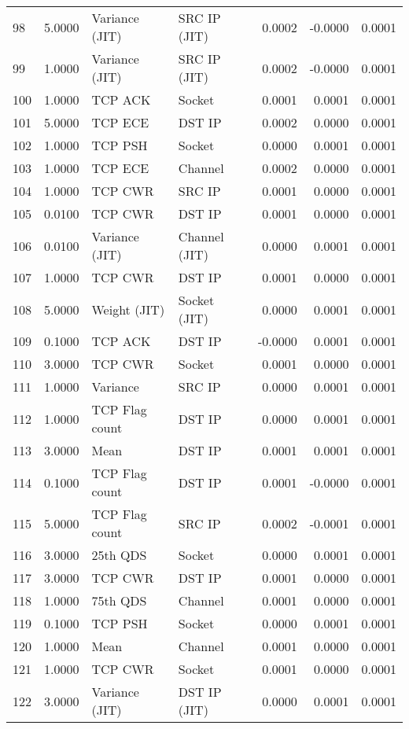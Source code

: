 \begin{longtable}{lrllrrr}
98 & 5.0000 & Variance (JIT) & SRC IP (JIT) & 0.0002 & -0.0000 & 0.0001 \\
99 & 1.0000 & Variance (JIT) & SRC IP (JIT) & 0.0002 & -0.0000 & 0.0001 \\
100 & 1.0000 & TCP ACK & Socket & 0.0001 & 0.0001 & 0.0001 \\
101 & 5.0000 & TCP ECE & DST IP & 0.0002 & 0.0000 & 0.0001 \\
102 & 1.0000 & TCP PSH & Socket & 0.0000 & 0.0001 & 0.0001 \\
103 & 1.0000 & TCP ECE & Channel & 0.0002 & 0.0000 & 0.0001 \\
104 & 1.0000 & TCP CWR & SRC IP & 0.0001 & 0.0000 & 0.0001 \\
105 & 0.0100 & TCP CWR & DST IP & 0.0001 & 0.0000 & 0.0001 \\
106 & 0.0100 & Variance (JIT) & Channel (JIT) & 0.0000 & 0.0001 & 0.0001 \\
107 & 1.0000 & TCP CWR & DST IP & 0.0001 & 0.0000 & 0.0001 \\
108 & 5.0000 & Weight (JIT) & Socket (JIT) & 0.0000 & 0.0001 & 0.0001 \\
109 & 0.1000 & TCP ACK & DST IP & -0.0000 & 0.0001 & 0.0001 \\
110 & 3.0000 & TCP CWR & Socket & 0.0001 & 0.0000 & 0.0001 \\
111 & 1.0000 & Variance & SRC IP & 0.0000 & 0.0001 & 0.0001 \\
112 & 1.0000 & TCP Flag count & DST IP & 0.0000 & 0.0001 & 0.0001 \\
113 & 3.0000 & Mean & DST IP & 0.0001 & 0.0001 & 0.0001 \\
114 & 0.1000 & TCP Flag count & DST IP & 0.0001 & -0.0000 & 0.0001 \\
115 & 5.0000 & TCP Flag count & SRC IP & 0.0002 & -0.0001 & 0.0001 \\
116 & 3.0000 & 25th QDS & Socket & 0.0000 & 0.0001 & 0.0001 \\
117 & 3.0000 & TCP CWR & DST IP & 0.0001 & 0.0000 & 0.0001 \\
118 & 1.0000 & 75th QDS & Channel & 0.0001 & 0.0000 & 0.0001 \\
119 & 0.1000 & TCP PSH & Socket & 0.0000 & 0.0001 & 0.0001 \\
120 & 1.0000 & Mean & Channel & 0.0001 & 0.0000 & 0.0001 \\
121 & 1.0000 & TCP CWR & Socket & 0.0001 & 0.0000 & 0.0001 \\
122 & 3.0000 & Variance (JIT) & DST IP (JIT) & 0.0000 & 0.0001 & 0.0001 \\

\end{longtable}
